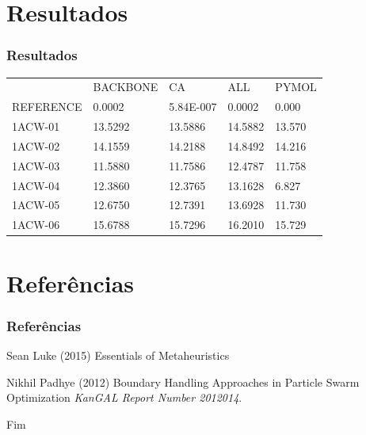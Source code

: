\documentclass{beamer}
\begin{document}
\section{Resultados}

\begin{frame}
\frametitle{Resultados}
\begin{table}[]
\centering
\label{my-label}
\begin{tabular}{lllll}
          & BACKBONE          & CA            & ALL    & PYMOL           \\
REFERENCE & 0.0002 & 5.84E-007     & 0.0002 & 0.000 \\
1ACW-01   & 13.5292     & 13.5886 & 14.5882 & 13.570   \\
1ACW-02   & 14.1559     & 14.2188 & 14.8492 & 14.216    \\
1ACW-03   & 11.5880     & 11.7586 & 12.4787 & 11.758   \\
1ACW-04   & 12.3860     & 12.3765 & 13.1628 & 6.827  \\
1ACW-05   & 12.6750     & 12.7391 & 13.6928 & 11.730   \\
1ACW-06   & 15.6788     & 15.7296 & 16.2010 & 15.729                   
\end{tabular}
\end{table}
\end{frame}

\section{Referências}

\begin{frame}
\frametitle{Referências}
\footnotesize{
\begin{thebibliography}{99} %
 Sean Luke (2015)
\newblock Essentials of Metaheuristics

 Nikhil Padhye (2012)
\newblock Boundary Handling Approaches in Particle Swarm Optimization
\newblock \emph{KanGAL Report Number 2012014}.

\end{thebibliography}
}
\end{frame}


\begin{frame}
\Huge{\centerline{Fim}}
\end{frame}

\end{document}
